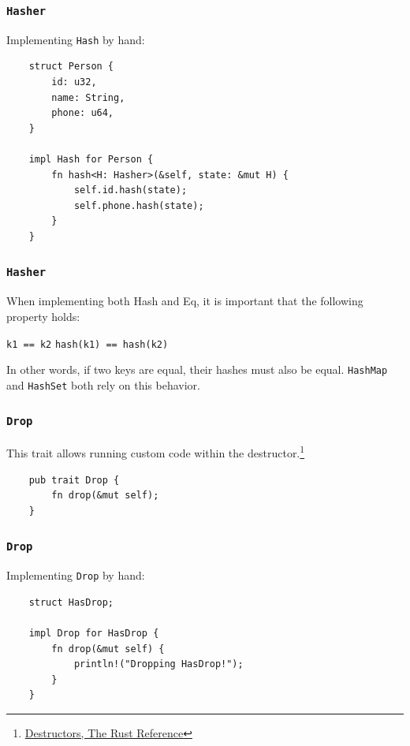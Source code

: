 \documentclass[aspectratio=1610,t]{beamer}
\begin{document}

\begin{frame}[fragile]
\frametitle{\texttt{Hasher}}
Implementing \texttt{Hash} by hand:

\begin{verbatim}
    struct Person {
        id: u32,
        name: String,
        phone: u64,
    }

    impl Hash for Person {
        fn hash<H: Hasher>(&self, state: &mut H) {
            self.id.hash(state);
            self.phone.hash(state);
        }
    }
\end{verbatim}
\end{frame}


\begin{frame}[fragile]
\frametitle{\texttt{Hasher}}
When implementing both Hash and Eq, it is important that the following property holds:

\texttt{k1 == k2} \Longrightarrow \texttt{hash(k1) == hash(k2)}

In other words, if two keys are equal, their hashes must also be equal. \texttt{HashMap} and \texttt{HashSet} both rely on this behavior.
\end{frame}


\begin{frame}[fragile]
\frametitle{\texttt{Drop}}
This trait allows running custom code within the destructor.\footnote{\href{https://doc.rust-lang.org/reference/destructors.html}{Destructors, The Rust Reference}}

\begin{verbatim}
    pub trait Drop {
        fn drop(&mut self);
    }
\end{verbatim}
\end{frame}


\begin{frame}[fragile]
\frametitle{\texttt{Drop}}
Implementing \texttt{Drop} by hand:

\begin{verbatim}
    struct HasDrop;

    impl Drop for HasDrop {
        fn drop(&mut self) {
            println!("Dropping HasDrop!");
        }
    }
\end{verbatim}
\end{frame}
\end{document}
